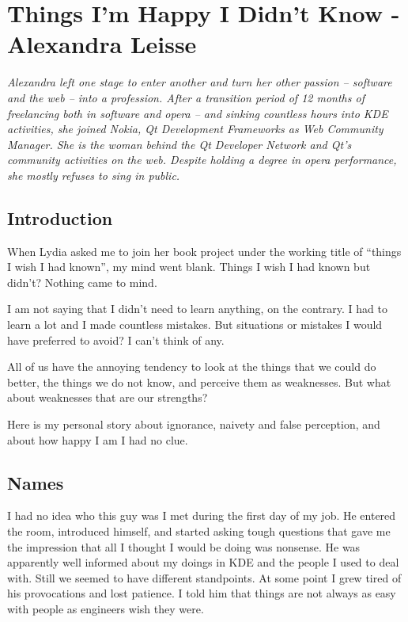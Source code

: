 \chapter{Things I'm Happy I Didn't Know - Alexandra Leisse}

\textit{Alexandra left one stage to enter another and turn her other passion -- software and the web -- into a profession. After a transition period of 12 months of freelancing both in software and opera -- and sinking countless hours into KDE activities, she joined Nokia, Qt Development Frameworks as Web Community Manager.
\newline
She is the woman behind the Qt Developer Network and Qt’s community activities on the web. Despite holding a degree in opera performance, she mostly refuses to sing in public.}

\section*{Introduction}

When Lydia asked me to join her book project under the working title of ``things I wish I had known'', my mind went blank. Things I wish I had known but didn't? Nothing came to mind.

I am not saying that I didn't need to learn anything, on the contrary. I had to learn a lot and I made countless mistakes. But situations or mistakes I would have preferred to avoid? I can't think of any.

All of us have the annoying tendency to look at the things that we could do better, the things we do not know, and perceive them as weaknesses. But what about weaknesses that are our strengths?

Here is my personal story about ignorance, naivety and false perception, and about how happy I am I had no clue.

\section*{Names}

I had no idea who this guy was I met during the first day of my job. He entered the room, introduced himself, and started asking tough questions that gave me the impression that all I thought I would be doing was nonsense. He was apparently well informed about my doings in KDE and the people I used to deal with. Still we seemed to have different standpoints. At some point I grew tired of his provocations and lost patience. I told him that things are not always as easy with people as engineers wish they were.

